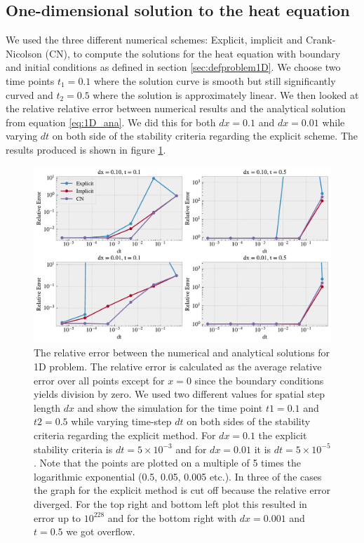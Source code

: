 \documentclass[%
 reprint,
nofootinbib,
aps,
]{revtex4-1}
\begin{document}
\subsection{One-dimensional solution to the heat equation}
We used the three different numerical schemes: Explicit, implicit and Crank-Nicolson (CN), to compute the solutions for the heat equation with boundary and initial conditions as defined in section \ref{sec:defproblem1D}. We choose two time points $t_1 = 0.1$ where the solution curve is smooth but still significantly curved and $t_2 = 0.5$ where the solution is approximately linear. We then looked at the relative relative error between numerical results and the analytical solution from equation \ref{eq:1D_ana}. We did this for both $dx = 0.1$ and $dx = 0.01$ while varying $dt$ on both side of the stability criteria regarding the explicit scheme. The results produced is shown in figure \ref{fig:compare_error_dt}.


\onecolumngrid

\begin{figure}[H]
    \centering
    \includegraphics[width=\textwidth]{figures/1D_compare.pdf}
    \caption{The relative error between the numerical and analytical solutions for 1D problem. The relative error is calculated as the average relative error over all points except for $x=0$ since the boundary conditions yields division by zero. We used two different values for spatial step length $dx$ and show the simulation for the time point $t1 = 0.1$ and $t2 = 0.5$ while varying time-step $dt$ on both sides of the stability criteria regarding the explicit method. For $dx = 0.1$ the explicit stability criteria is $dt = 5\times10^{-3}$ and for $dx = 0.01$ it is $dt = 5\times10^{-5}$. Note that the points are plotted on a multiple of 5 times the logarithmic exponential (0.5, 0.05, 0.005 etc.). In three of the cases the graph for the explicit method is cut off because the relative error diverged. For the top right and bottom left plot this resulted in error up to $10^{228}$ and for the bottom right with $dx = 0.001$ and $t = 0.5$ we got overflow.}
    \label{fig:compare_error_dt}
\end{figure}
\end{document}
